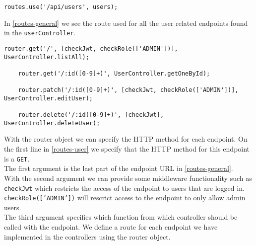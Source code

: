 \begin{lstlisting}[caption={The route used for all user related endpoints}, captionpos=b, label={routes-general}]
    routes.use('/api/users', users);
\end{lstlisting}
In \autoref{routes-general} we see the route used for all the user related endpoints found in the \texttt{userController}.
\begin{lstlisting}[caption={Some of the routes for the different user endpoints}, captionpos=b, label={routes-user}]
    router.get('/', [checkJwt, checkRole(['ADMIN'])], UserController.listAll);

    router.get('/:id([0-9]+)', UserController.getOneById);

    router.patch('/:id([0-9]+)', [checkJwt, checkRole(['ADMIN'])], UserController.editUser);

    router.delete('/:id([0-9]+)', [checkJwt], UserController.deleteUser);
\end{lstlisting}
With the router object we can specify the HTTP method for each endpoint. 
On the first line in \autoref{routes-user} we specify that the HTTP method for this endpoint is a \texttt{GET}.
\\
The first argument is the last part of the endpoint URL in \autoref{routes-general}. 
\\
With the second argument we can provide some middleware functionality such as \texttt{checkJwt} which restricts the access of the endpoint to users that are logged in.
\texttt{checkRole(['ADMIN'])} will rescrict access to the endpoint to only allow admin users. 
\\
The third argument specifies which function from which controller should be called with the endpoint.
We define a route for each endpoint we have implemented in the controllers using the router object.

